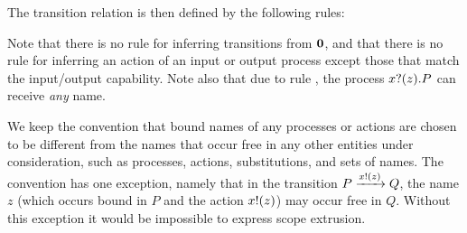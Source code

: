 The transition relation is then defined by the following rules:
Note that there is no rule for inferring transitions from \( \bm{0} \), and that there is no rule for inferring an action of an input or output process except those that match the input/output capability.
Note also that due to rule , the process \( x ? (z) . P \) can receive \emph{any} name.

We keep the convention that bound names of any processes or actions
are chosen to be different from the names that occur free in any other
entities under consideration, such as processes, actions,
substitutions, and sets of names.  The convention has one exception,
namely that in the transition \( P \xrightarrow{x ! (z)} Q \),
the name \( z \) (which occurs bound in \( P \) and the action
\( x ! (z) \)) may occur free in \( Q \).  Without this exception
it would be impossible to express scope extrusion.

